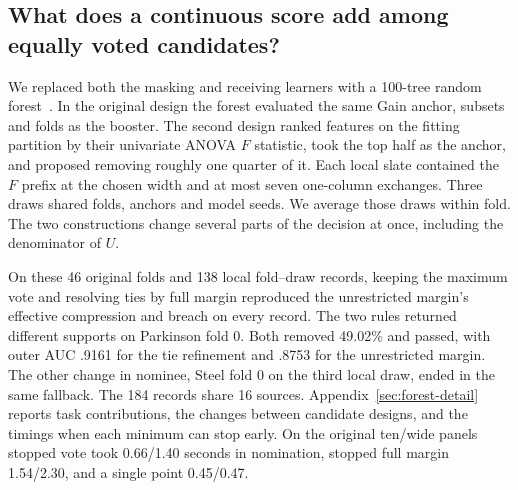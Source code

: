 \subsection{What does a continuous score add among equally voted candidates?}
We replaced both the masking and receiving learners with a 100-tree random forest~\cite{breiman2001random}. In the original design the forest evaluated the same Gain anchor, subsets and folds as the booster. The second design ranked features on the fitting partition by their univariate ANOVA $F$ statistic, took the top half as the anchor, and proposed removing roughly one quarter of it. Each local slate contained the $F$ prefix at the chosen width and at most seven one-column exchanges. Three draws shared folds, anchors and model seeds. We average those draws within fold. The two constructions change several parts of the decision at once, including the denominator of $U$.



On these 46 original folds and 138 local fold--draw records, keeping the maximum vote and resolving ties by full margin reproduced the unrestricted margin's effective compression and breach on every record. The two rules returned different supports on Parkinson fold 0. Both removed 49.02\% and passed, with outer AUC .9161 for the tie refinement and .8753 for the unrestricted margin. The other change in nominee, Steel fold 0 on the third local draw, ended in the same fallback. The 184 records share 16 sources. Appendix~\ref{sec:forest-detail} reports task contributions, the changes between candidate designs, and the timings when each minimum can stop early. On the original ten/wide panels stopped vote took 0.66/1.40 seconds in nomination, stopped full margin 1.54/2.30, and a single point 0.45/0.47.
